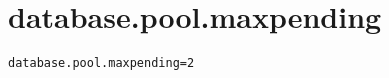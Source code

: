 \section{database.pool.maxpending}
\label{configuration:DatabasePoolMaxpending}
\ClearAPI
\TODO
{}
\begin{lstlisting}[style=Props,caption={Usage example for \textit{database.pool.maxpending}}]
database.pool.maxpending=2
\end{lstlisting}